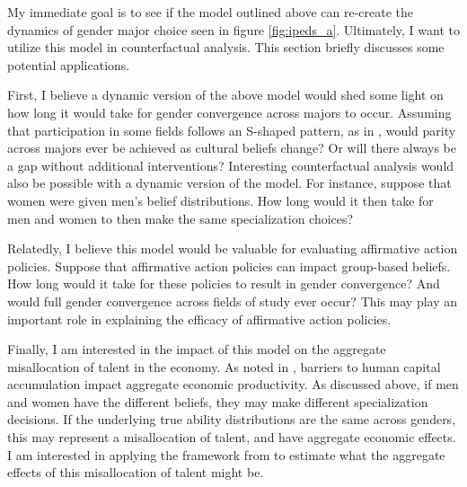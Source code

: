 \documentclass[11 pt]{article}
\newcommand{\toedit}[1]{{\color{gray}#1}}
\newcommand{\toedit}[1]{#1}
\begin{document}
My immediate goal is to see if the model outlined above can re-create the dynamics of gender major choice seen in figure \ref{fig:ipeds_a}.
Ultimately, I want to utilize this model in counterfactual analysis.
This section briefly discusses some potential applications.

First, I believe a dynamic version of the above model would shed some light on how long it would take for gender convergence across majors to occur. 
Assuming that participation in some fields follows an S-shaped pattern, as in \textcite{F13}, would parity across majors ever be achieved as cultural beliefs change?
Or will there always be a gap without additional interventions?
Interesting counterfactual analysis would also be possible with a dynamic version of the model. 
For instance, suppose that women were given men's belief distributions.
How long would it then take for men and women to then make the same specialization choices?

Relatedly, I believe this model would be valuable for evaluating affirmative action policies.
Suppose that affirmative action policies can impact group-based beliefs.
How long would it take for these policies to result in gender convergence?
And would full gender convergence across fields of study ever occur?
This may play an important role in explaining the efficacy of affirmative action policies.

Finally, I am interested in the impact of this model on the aggregate misallocation of talent in the economy. 
As noted in \textcite{HHJK19}, barriers to human capital accumulation impact aggregate economic productivity.
As discussed above, if men and women have the different beliefs, they may make different specialization decisions.
If the underlying true ability distributions are the same across genders, this may represent a misallocation of talent, and have aggregate economic effects. 
I am interested in applying the framework from \textcite{HHJK19} to estimate what the aggregate effects of this misallocation of talent might be. 
\end{document}
